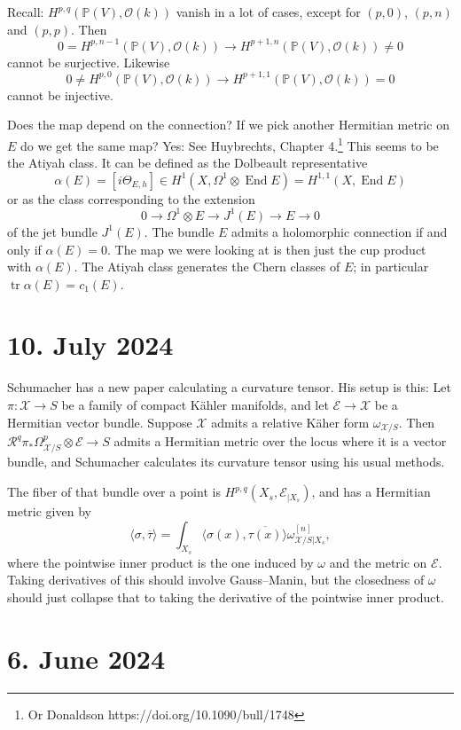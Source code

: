 \documentclass[11pt]{amsart}
\theoremstyle{definition}
\newcommand{\cc}[1]{\mathcal{#1}}
\def\^#1{^{[#1]}}
\def\ov#1{\overline{#1}}
\DeclareMathOperator{\End}{End}
\DeclareMathOperator{\tr}{tr}
\def\<{\langle}
\def\>{\rangle}
\begin{document}
Recall: $H^{p,q}(\mathbb P(V), \cc O(k))$ vanish in a lot of cases, except for
$(p,0)$, $(p,n)$ and $(p,p)$.
Then
$$
0 = H^{p,n-1}(\mathbb P(V), \cc O(k)) 
\to H^{p+1,n}(\mathbb P(V), \cc O(k)) \not= 0
$$
cannot be surjective.
Likewise
$$
0 \not= H^{p,0}(\mathbb P(V), \cc O(k)) 
\to H^{p+1,1}(\mathbb P(V), \cc O(k)) = 0
$$
cannot be injective.

Does the map depend on the connection?
If we pick another Hermitian metric on $E$ do we get the same map?
Yes: See Huybrechts, Chapter 4.\footnote{Or Donaldson https://doi.org/10.1090/bull/1748}
This seems to be the Atiyah class.
It can be defined as the Dolbeault representative
$$
\alpha(E) = [i\Theta_{E,h}] \in H^1(X, \Omega^1 \otimes \End E)
= H^{1,1}(X, \End E)
$$
or as the class corresponding to the extension
$$
0 \longrightarrow \Omega^1 \otimes E
\longrightarrow J^1(E)
\longrightarrow E
\longrightarrow 0
$$
of the jet bundle $J^1(E)$.
The bundle $E$ admits a holomorphic connection if and only if $\alpha(E) = 0$.
The map we were looking at is then just the cup product with $\alpha(E)$.
The Atiyah class generates the Chern classes of $E$; in particular $\tr
\alpha(E) = c_1(E)$.


\section{10. July 2024}

Schumacher has a new paper calculating a curvature tensor.
His setup is this:
Let $\pi : \cc X \to S$ be a family of compact K\"ahler manifolds, and
let $\cc E \to \cc X$ be a Hermitian vector bundle.
Suppose $\cc X$ admits a relative K\"aher form $\omega_{\cc X/S}$.
Then $\cc R^q \pi_* \Omega_{\cc X/S}^p \otimes \cc E \to S$ admits a Hermitian
metric over the locus where it is a vector bundle, and Schumacher calculates
its curvature tensor using his usual methods.

The fiber of that bundle over a point is $H^{p,q}(X_s, \cc E_{|X_s})$, and has
a Hermitian metric given by
$$
\< \sigma, \ov\tau \>
= \int_{X_s} \< \sigma(x), \ov{\tau(x)} \> \omega\^n_{\cc X/S|X_s},
$$
where the pointwise inner product is the one induced by $\omega$ and the metric
on $\cc E$.
Taking derivatives of this should involve Gauss--Manin, but the closedness of
$\omega$ should just collapse that to taking the derivative of the pointwise
inner product.

\section{6. June 2024}
\end{document}
